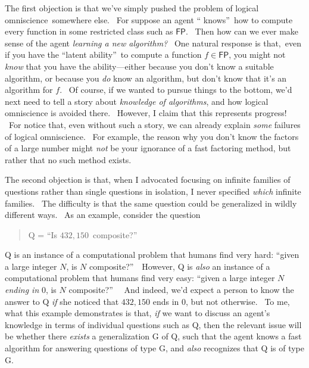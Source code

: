 \documentclass[12pt,onecolumn]{article}%
\begin{document}
The first objection is that we've simply pushed the problem of logical
omniscience\ somewhere else. \ For suppose an agent \textquotedblleft
knows\textquotedblright\ how to compute every function in some restricted
class such as $\mathsf{FP}$. \ Then how can we ever make sense of the agent
\textit{learning a new algorithm?} \ One natural response is that,\ even if
you have the \textquotedblleft latent ability\textquotedblright\ to compute a
function $f\in\mathsf{FP}$, you might not \textit{know} that you have the
ability---either because you don't know a suitable algorithm, or because you
\textit{do} know an algorithm, but don't know that it's an algorithm for $f$.
\ Of course, if we wanted to pursue things to the bottom, we'd next need to
tell a story about \textit{knowledge of algorithms}, and how logical
omniscience is avoided there. \ However, I claim that this represents
progress! \ For notice that, even without such a story, we can already explain
\textit{some} failures of logical omniscience. \ For example, the reason why
you don't know the factors of a large number might \textit{not} be your
ignorance of a fast factoring method, but rather that no such method exists.

The second objection is that, when I advocated focusing on infinite families
of questions rather than single questions in isolation, I never specified
\textit{which} infinite families. \ The difficulty is that the same question
could be generalized in wildly different ways. \ As an example, consider the question

\begin{quotation}
\noindent Q = \textquotedblleft Is $432,150$\ composite?\textquotedblright
\end{quotation}

\noindent Q is an instance of a computational problem that humans find very
hard: \textquotedblleft given a large integer $N$, is $N$
composite?\textquotedblright\ \ However, Q is \textit{also} an instance of a
computational problem that humans find very easy: \textquotedblleft given a
large integer $N$ \textit{ending in} $0$, is $N$ composite?\textquotedblright%
\ \ And indeed, we'd expect a person to know the answer to Q \textit{if} she
noticed that $432,150$ ends in $0$, but not otherwise. \ To me, what this
example demonstrates is that, \textit{if} we want to discuss an agent's
knowledge in terms of individual questions such as Q, then the relevant issue
will be whether there \textit{exists} a generalization G of Q, such that the
agent knows a fast algorithm for answering questions of type G, and
\textit{also} recognizes that Q is of type G.
\end{document}
